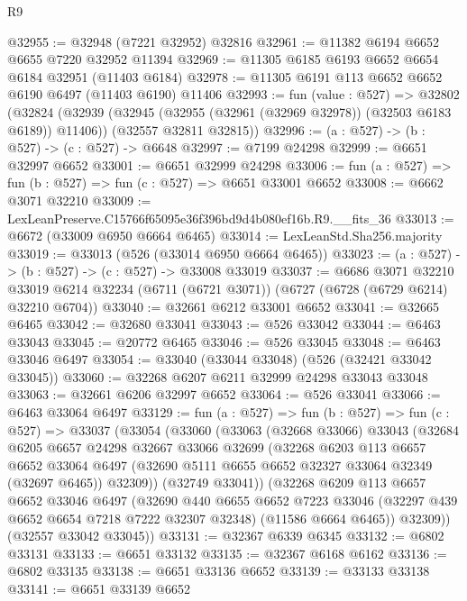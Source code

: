 \begin{lexlean}{R9}
\begin{coremodule}
@32955 := @32948 (@7221 @32952) @32816
@32961 := @11382 @6194 @6652 @6655 @7220 @32952 @11394
@32969 := @11305 @6185 @6193 @6652 @6654 @6184 @32951 (@11403 @6184)
@32978 := @11305 @6191 @113 @6652 @6652 @6190 @6497 (@11403 @6190) @11406
@32993 := fun (value : @527) =>
  @32802
    (@32824
      (@32939 (@32945 (@32955 (@32961 (@32969 @32978)) (@32503 @6183 @6189)) @11406))
      (@32557 @32811 @32815))
@32996 := (a : @527) -> (b : @527) -> (c : @527) -> @6648
@32997 := @7199 @24298
@32999 := @6651 @32997 @6652
@33001 := @6651 @32999 @24298
@33006 := fun (a : @527) => fun (b : @527) => fun (c : @527) => @6651 @33001 @6652
@33008 := @6662 @3071 @32210
@33009 := LexLeanPreserve.C15766f65095e36f396bd9d4b080ef16b.R9.__fits_36
@33013 := @6672 (@33009 @6950 @6664 @6465)
@33014 := LexLeanStd.Sha256.majority
@33019 := @33013 (@526 (@33014 @6950 @6664 @6465))
@33023 := (a : @527) -> (b : @527) -> (c : @527) -> @33008 @33019
@33037 := @6686
    @3071
    @32210
    @33019
    @6214
    @32234
    (@6711 (@6721 @3071))
    (@6727 (@6728 (@6729 @6214) @32210 @6704))
@33040 := @32661 @6212 @33001 @6652
@33041 := @32665 @6465
@33042 := @32680 @33041
@33043 := @526 @33042
@33044 := @6463 @33043
@33045 := @20772 @6465
@33046 := @526 @33045
@33048 := @6463 @33046 @6497
@33054 := @33040 (@33044 @33048) (@526 (@32421 @33042 @33045))
@33060 := @32268 @6207 @6211 @32999 @24298 @33043 @33048
@33063 := @32661 @6206 @32997 @6652
@33064 := @526 @33041
@33066 := @6463 @33064 @6497
@33129 := fun (a : @527) =>
  fun (b : @527) =>
  fun (c : @527) =>
  @33037
    (@33054
      (@33060
        (@33063
          (@32668 @33066)
          @33043
          (@32684
            @6205
            @6657
            @24298
            @32667
            @33066
            @32699
            (@32268
              @6203
              @113
              @6657
              @6652
              @33064
              @6497
              (@32690 @5111 @6655 @6652 @32327 @33064 @32349 (@32697 @6465))
              @32309))
          (@32749 @33041))
        (@32268
          @6209
          @113
          @6657
          @6652
          @33046
          @6497
          (@32690
            @440
            @6655
            @6652
            @7223
            @33046
            (@32297 @439 @6652 @6654 @7218 @7222 @32307 @32348)
            (@11586 @6664 @6465))
          @32309))
      (@32557 @33042 @33045))
@33131 := @32367 @6339 @6345
@33132 := @6802 @33131
@33133 := @6651 @33132
@33135 := @32367 @6168 @6162
@33136 := @6802 @33135
@33138 := @6651 @33136 @6652
@33139 := @33133 @33138
@33141 := @6651 @33139 @6652

\end{coremodule}
\end{lexlean}
